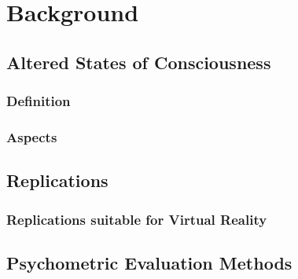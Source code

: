 \chapter{Background}
\vspace{-1.6em}
%

\minitoc
\thispagestyle{empty}
\newpage

\section{Altered States of Consciousness}
\subsection{Definition}\label{sec:asc_definition}
\subsection{Aspects}
\section{Replications}
\subsection{Replications suitable for Virtual Reality}
\section{Psychometric Evaluation Methods}
